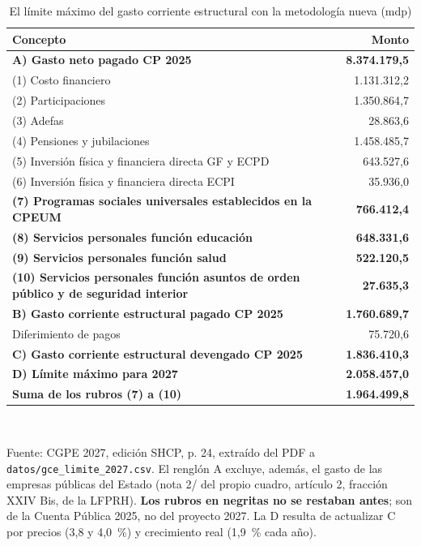 \begin{table}[htbp]\centering\footnotesize
\caption{El límite máximo del gasto corriente estructural con la metodología nueva (mdp)}\label{cua:gcemetodo}
\begin{tabular}{>{\raggedright\arraybackslash}p{9.6cm}r}
\toprule
Concepto & Monto \\
\midrule
\textbf{A) Gasto neto pagado CP 2025} & \textbf{8.374.179,5} \\
\quad (1) Costo financiero & 1.131.312,2 \\
\quad (2) Participaciones & 1.350.864,7 \\
\quad (3) Adefas & 28.863,6 \\
\quad (4) Pensiones y jubilaciones & 1.458.485,7 \\
\quad (5) Inversión física y financiera directa GF y ECPD & 643.527,6 \\
\quad (6) Inversión física y financiera directa ECPI & 35.936,0 \\
\quad \textbf{(7) Programas sociales universales establecidos en la CPEUM} & \textbf{766.412,4} \\
\quad \textbf{(8) Servicios personales función educación} & \textbf{648.331,6} \\
\quad \textbf{(9) Servicios personales función salud} & \textbf{522.120,5} \\
\quad \textbf{(10) Servicios personales función asuntos de orden público y de seguridad interior} & \textbf{27.635,3} \\
\textbf{B) Gasto corriente estructural pagado CP 2025} & \textbf{1.760.689,7} \\
\quad Diferimiento de pagos & 75.720,6 \\
\textbf{C) Gasto corriente estructural devengado CP 2025} & \textbf{1.836.410,3} \\
\textbf{D) Límite máximo para 2027} & \textbf{2.058.457,0} \\
\midrule \textbf{Suma de los rubros (7) a (10)} & \textbf{1.964.499,8} \\
\bottomrule
\end{tabular}
\\[2pt]\begin{minipage}{0.92\textwidth}\scriptsize Fuente: CGPE 2027, edición SHCP, p. 24, extraído del PDF a \texttt{datos/gce\_limite\_2027.csv}. El renglón A excluye, además, el gasto de las empresas públicas del Estado (nota 2/ del propio cuadro, artículo 2, fracción XXIV Bis, de la LFPRH). \textbf{Los rubros en negritas no se restaban antes}; son de la Cuenta Pública 2025, no del proyecto 2027. La D resulta de actualizar C por precios (3,8 y 4,0~\%) y crecimiento real (1,9~\% cada año).\end{minipage}
\end{table}
